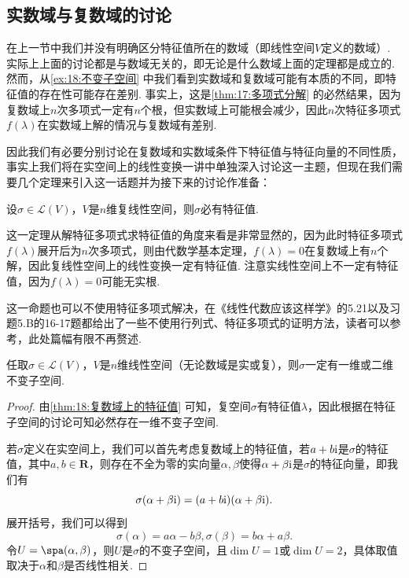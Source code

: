 \subsection{实数域与复数域的讨论}

在上一节中我们并没有明确区分特征值所在的数域（即线性空间$V$定义的数域）. 实际上上面的讨论都是与数域无关的，即无论是什么数域上面的定理都是成立的. 然而，从\autoref{ex:18:不变子空间} 中我们看到实数域和复数域可能有本质的不同，即特征值的存在性可能存在差别. 事实上，这是\autoref{thm:17:多项式分解} 的必然结果，因为复数域上$n$次多项式一定有$n$个根，但实数域上可能根会减少，因此$n$次特征多项式$f(\lambda)$在实数域上解的情况与复数域有差别.

因此我们有必要分别讨论在复数域和实数域条件下特征值与特征向量的不同性质，事实上我们将在实空间上的线性变换一讲中单独深入讨论这一主题，但现在我们需要几个定理来引入这一话题并为接下来的讨论作准备：
\begin{theorem}\label{thm:18:复数域上的特征值}
    设$\sigma\in \mathcal{L}(V)$，$V$是$n$维复线性空间，则$\sigma$必有特征值.
\end{theorem}

这一定理从解特征多项式求特征值的角度来看是非常显然的，因为此时特征多项式$f(\lambda)$展开后为$n$次多项式，则由代数学基本定理，$f(\lambda)=0$在复数域上有$n$个解，因此复线性空间上的线性变换一定有特征值. 注意实线性空间上不一定有特征值，因为$f(\lambda)=0$可能无实根.

这一命题也可以不使用特征多项式解决，在《线性代数应该这样学》的5.21以及习题5.B的16-17题都给出了一些不使用行列式、特征多项式的证明方法，读者可以参考，此处篇幅有限不再赘述.

\begin{theorem}\label{thm:18:特征值与不变子空间}
    任取$\sigma\in \mathcal{L}(V)$，$V$是$n$维线性空间（无论数域是实或复），则$\sigma$一定有一维或二维不变子空间.
\end{theorem}

\begin{proof}
    由\autoref{thm:18:复数域上的特征值} 可知，复空间$\sigma$有特征值$\lambda$，因此根据在特征子空间的讨论可知必然存在一维不变子空间.

    若$\sigma$定义在实空间上，我们可以首先考虑复数域上的特征值，若$a+b\textup{i}$是$\sigma$的特征值，其中$a,b\in\mathbf{R}$，则存在不全为零的实向量$\alpha,\beta$使得$\alpha+\beta\textup{i}$是$\sigma$的特征向量，即我们有
    \[\sigma(\alpha+\beta\textup{i})=(a+b\textup{i})(\alpha+\beta\textup{i}).\]
    展开括号，我们可以得到
    \[\sigma(\alpha)=a\alpha-b\beta,\sigma(\beta)=b\alpha+a\beta.\]
    令$U=\spa(\alpha,\beta)$，则$U$是$\sigma$的不变子空间，且$\dim U=1$或$\dim U=2$，具体取值取决于$\alpha$和$\beta$是否线性相关.
\end{proof}

